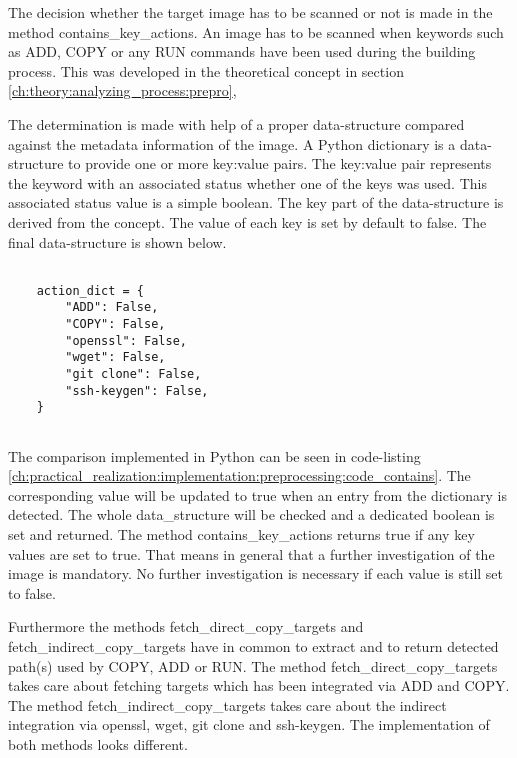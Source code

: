 The decision whether the target image has to be scanned or not is made in the method contains\_key\_actions.
An image has to be scanned when keywords such as ADD, COPY or any RUN commands have been used during the building process. 
This was developed in the theoretical concept in section \ref{ch:theory:analyzing_process:prepro}, 

The determination is made with help of a proper data-structure compared against the metadata information of the image.
A Python dictionary is a data-structure to provide one or more key:value pairs.
The key:value pair represents the keyword with an associated status whether one of the keys was used. 
This associated status value is a simple boolean.
The key part of the data-structure is derived from the concept. 
The value of each key is set by default to false. 
The final data-structure is shown below.
\lstset{language=Python}          %
\begin{lstlisting}[]  % Start your code-block
	
    action_dict = {
        "ADD": False,
        "COPY": False,
        "openssl": False,
        "wget": False,
        "git clone": False,
        "ssh-keygen": False,
    }
    
\end{lstlisting}
The comparison implemented in Python can be seen in code-listing \ref{ch:practical_realization:implementation:preprocessing:code_contains}. 
The corresponding value will be updated to true when an entry from the dictionary is detected. 
The whole data\_structure will be checked and a dedicated boolean is set and returned. 
The method contains\_key\_actions returns true if any key values are set to true. 
That means in general that a further investigation of the image is mandatory. 
No further investigation is necessary if each value is still set to false.

Furthermore the methods fetch\_direct\_copy\_targets and fetch\_indirect\_copy\_targets have in common to extract and to return detected path(s) used by COPY, ADD or RUN. 
The method fetch\_direct\_copy\_targets takes care about fetching targets which has been integrated via ADD and COPY. 
The method fetch\_indirect\_copy\_targets takes care about the indirect integration via openssl, wget, git clone and ssh-keygen. 
The implementation of both methods looks different.

